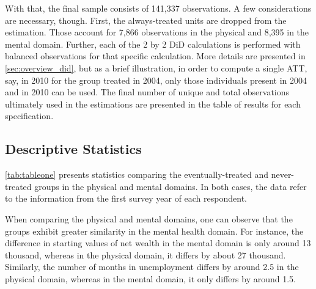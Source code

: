 With that, the final sample consists of 141,337 observations. A few considerations are necessary, though. First,
the always-treated units are dropped from the estimation. Those account for 7,866 observations in the physical and
8,395 in the mental domain. Further, each of the 2 by 2 DiD calculations is performed with balanced observations
for that specific calculation. More details are presented in \cref{sec:overview_did}, but as a brief illustration,
in order to compute a single ATT, say, in 2010 for the group treated in 2004, only those individuals present in
2004 and in 2010 can be used. The final number of unique and total observations ultimately used in the estimations
are presented in the table of results for each specification.

\subsection{Descriptive Statistics}

\cref{tab:tableone} presents statistics comparing the eventually-treated and never-treated groups in the physical
and mental domains. In both cases, the data refer to the information from the first survey year of each respondent.

When comparing the physical and mental domains, one can observe that the groups exhibit greater similarity in the
mental health domain. For instance, the difference in starting values of net wealth in the mental domain is only
around 13 thousand, whereas in the physical domain, it differs by about 27 thousand. Similarly, the number of
months in unemployment differs by around 2.5 in the physical domain, whereas in the mental domain, it only differs
by around 1.5.


